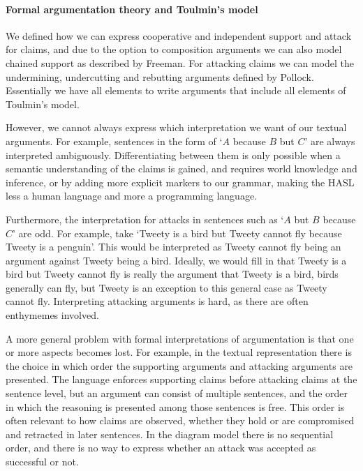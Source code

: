 
\paragraph{Formal argumentation theory and Toulmin's model}
We defined how we can express cooperative and independent support and attack for claims, and due to the option to composition arguments we can also model chained support as described by Freeman\cite{Freeman:1991ef}. For attacking claims we can model the undermining, undercutting and rebutting arguments defined by Pollock\cite{pollock1987}. Essentially we have all elements to write arguments that include all elements of Toulmin's model\cite{toulmin1958}.

However, we cannot always express which interpretation we want of our textual arguments. For example, sentences in the form of `$A$ because $B$ but $C$' are always interpreted ambiguously. Differentiating between them is only possible when a semantic understanding of the claims is gained, and requires world knowledge and inference, or by adding more explicit markers to our grammar, making the HASL less a human language and more a programming language. 

Furthermore, the interpretation for attacks in sentences such as `$A$ but $B$ because $C$' are odd. For example, take `Tweety is a bird but Tweety cannot fly because Tweety is a penguin'. This would be interpreted as Tweety cannot fly being an argument against Tweety being a bird. Ideally, we would fill in that Tweety is a bird but Tweety cannot fly is really the argument that Tweety is a bird, birds generally can fly, but Tweety is an exception to this general case as Tweety cannot fly. Interpreting attacking arguments is hard, as there are often enthymemes involved.

A more general problem with formal interpretations of argumentation is that one or more aspects becomes lost. For example, in the textual representation there is the choice in which order the supporting arguments and attacking arguments are presented. The language enforces supporting claims before attacking claims at the sentence level, but an argument can consist of multiple sentences, and the order in which the reasoning is presented among those sentences is free. This order is often relevant to how claims are observed, whether they hold or are compromised and retracted in later sentences. In the diagram model there is no sequential order, and there is no way to express whether an attack was accepted as successful or not.

